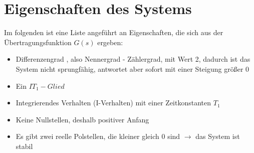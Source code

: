 \section{Eigenschaften des Systems}

Im folgenden ist eine Liste angeführt an Eigenschaften, die sich aus der Übertragungsfunktion $G(s)$ ergeben:
\begin{itemize}
	\item Differenzengrad , also Nennergrad - Zählergrad, mit Wert 2, dadurch ist das System nicht sprungfähig, antwortet aber sofort mit einer Steigung größer 0
	\item Ein $IT_1-Glied$
	\item Integrierendes Verhalten (I-Verhalten) mit einer Zeitkonstanten $T_1$
	\item Keine Nullstellen, deshalb positiver Anfang
	\item Es gibt zwei reelle Polstellen, die kleiner gleich 0 sind $\rightarrow$ das System ist stabil
\end{itemize}